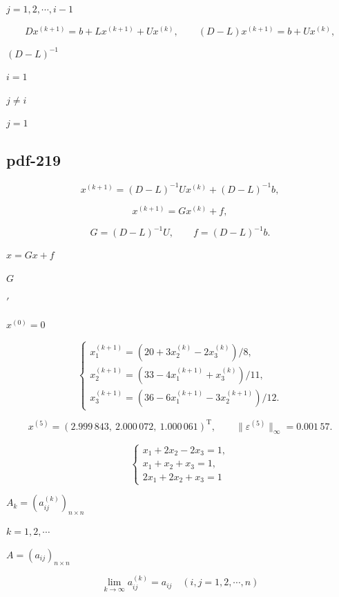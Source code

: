 \documentclass[UTF8,fontset=fandol]{ctexart}
\begin{document}
$j=1,2,\cdots,i-1$\par

\[
Dx^{(k+1)}=b+Lx^{(k+1)}+Ux^{(k)},\qquad(D-L)x^{(k+1)}=b+Ux^{(k)},
\]

$(D-L)^{-1}$\par

$i=1$\par

$j\neq i$\par

$j=1$\par

\subsection*{pdf-219}

\[
x^{(k+1)}=(D-L)^{-1}Ux^{(k)}+(D-L)^{-1}b,
\]

\[
x^{(k+1)}=Gx^{(k)}+f,
\tag{8.2.6}
\]

\[
G=(D-L)^{-1}U,\qquad f=(D-L)^{-1}b.
\]

$x=Gx+f$\par

$G$\par

$'$\par

$x^{(0)}=0$\par

\[
\begin{cases}
x_1^{(k+1)}=(20+3x_2^{(k)}-2x_3^{(k)})/8,\\
x_2^{(k+1)}=(33-4x_1^{(k+1)}+x_3^{(k)})/11,\\
x_3^{(k+1)}=(36-6x_1^{(k+1)}-3x_2^{(k+1)})/12.
\end{cases}
\]

\[
x^{(5)}=(2.999\,843,\ 2.000\,072,\ 1.000\,061)^{\mathrm T},\qquad
\|\varepsilon^{(5)}\|_\infty=0.001\,57.
\]

\[
\begin{cases}
x_1+2x_2-2x_3=1,\\
x_1+x_2+x_3=1,\\
2x_1+2x_2+x_3=1
\end{cases}
\]

$A_k=(a_{ij}^{(k)})_{n\times n}$\par

$k=1,2,\cdots$\par

$A=(a_{ij})_{n\times n}$\par

\[
\lim_{k\to\infty}a_{ij}^{(k)}=a_{ij}\quad(i,j=1,2,\cdots,n)
\]
\end{document}
